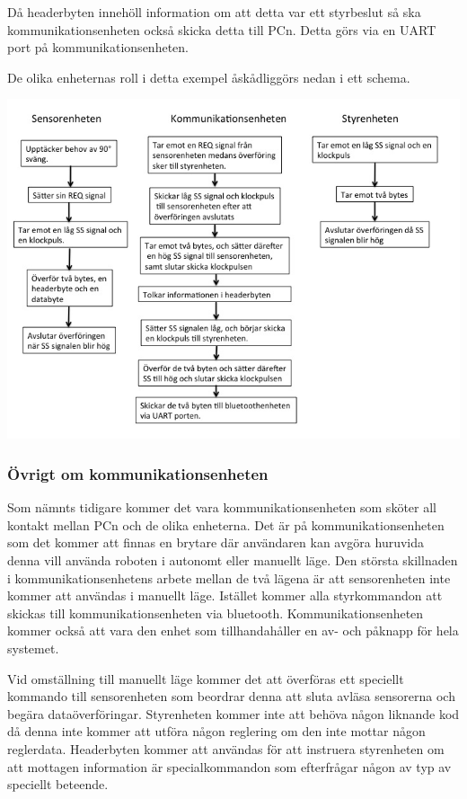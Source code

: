 Då headerbyten innehöll information om att detta var ett styrbeslut så ska kommunikationsenheten också skicka detta till PCn. Detta görs via en UART port på kommunikationsenheten.

De olika enheternas roll i detta exempel åskådliggörs nedan i ett schema.

\includegraphics[angle=0,scale=0.5]{bilder/Schema_exempel.png}

\subsubsection{Övrigt om kommunikationsenheten}

Som nämnts tidigare kommer det vara kommunikationsenheten som sköter all kontakt mellan PCn och de olika enheterna. Det är på kommunikationsenheten som det kommer att finnas en brytare där användaren kan avgöra huruvida denna vill använda roboten i autonomt eller manuellt läge. Den största skillnaden i kommunikationsenhetens arbete mellan de två lägena är att sensorenheten inte kommer att användas i manuellt läge. Istället kommer alla styrkommandon att skickas till kommunikationsenheten via bluetooth. Kommunikationsenheten kommer också att vara den enhet som tillhandahåller en av- och påknapp för hela systemet.

Vid omställning till manuellt läge kommer det att överföras ett speciellt kommando till sensorenheten som beordrar denna att sluta avläsa sensorerna och begära dataöverföringar. Styrenheten kommer inte att behöva någon liknande kod då denna inte kommer att utföra någon reglering om den inte mottar någon reglerdata. Headerbyten kommer att användas för att instruera styrenheten om att mottagen information är specialkommandon som efterfrågar någon av typ av speciellt beteende.

